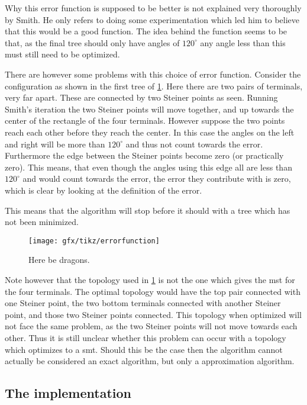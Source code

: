 Why this error function is supposed to be better is not explained very
thoroughly by Smith. He only refers to doing some experimentation which led him
to believe that this would be a good function.  The idea behind the function
seems to be that, as the final tree should only have angles of $120^{\circ}$ any
angle less than this must still need to be optimized.

There are however some problems with this choice of error function.  Consider
the configuration as shown in the first tree of \cref{fig:error-function}. Here
there are two pairs of terminals, very far apart.  These are connected by two
Steiner points as seen.  Running Smith's iteration the two Steiner points will
move together, and up towards the center of the rectangle of the four
terminals.  However suppose the two points reach each other before they reach
the center.  In this case the angles on the left and right will be more than
$120^{\circ}$ and thus not count towards the error.  Furthermore the edge
between the Steiner points become zero (or practically zero).  This means, that
even though the angles using this edge all are less than $120^{\circ}$ and would
count towards the error, the error they contribute with is zero, which is clear
by looking at the definition of the error.

This means that the algorithm will stop before it should with a tree which has
not been minimized.

\begin{figure}[htbp]
  \centering
  \texttt{[image: gfx/tikz/errorfunction]}
  \caption[Here be dragons.]{Here be dragons.\label{fig:error-function}}
\end{figure}

Note however that the topology used in \cref{fig:error-function} is not the
one which gives the \gls{mst} for the four terminals.  The optimal topology
would have the top pair connected with one Steiner point, the two bottom
terminals connected with another Steiner point, and those two Steiner points
connected.  This topology when optimized will not face the same problem, as the
two Steiner points will not move towards each other.  Thus it is still unclear
whether this problem can occur with a topology which optimizes to a \gls{smt}.
Should this be the case then the algorithm cannot actually be considered an
exact algorithm, but only a approximation algorithm.

\subsection{The implementation}
\label{sec:implementation}

